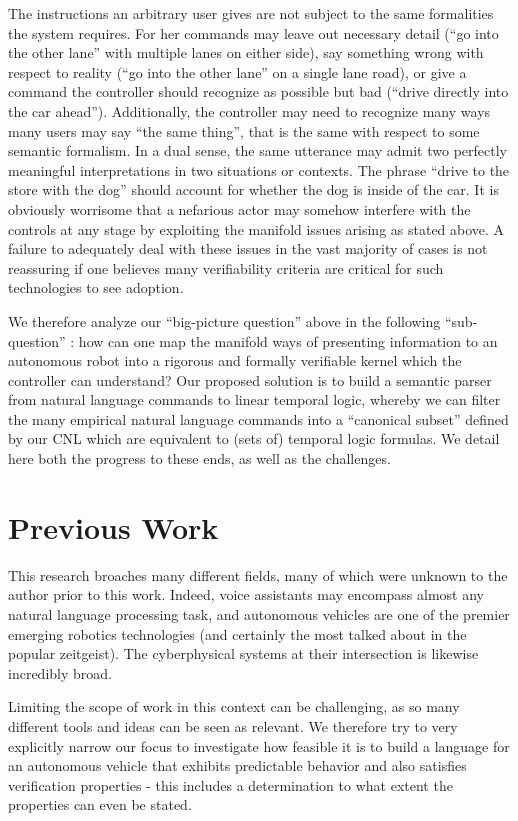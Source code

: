 \documentclass[a4paper, 11pt]{article}
\begin{document}
The instructions an arbitrary user gives are not subject to the same formalities
the system requires. For her commands may leave out necessary detail (``go into
the other lane'' with multiple lanes on either side), say something wrong with
respect to reality (``go into the other lane'' on a single lane road), or give a
command the controller should recognize as possible but bad (``drive directly
into the car ahead''). Additionally, the controller may need to recognize many
ways many users may say ``the same thing'', that is the same with respect to
some semantic formalism. In a dual sense, the same utterance may admit two
perfectly meaningful interpretations in two situations or contexts. The phrase
``drive to the store with the dog'' should account for whether the dog is inside
of the car. It is obviously worrisome that a nefarious actor may somehow
interfere with the controls at any stage by exploiting the manifold issues
arising as stated above. A failure to adequately deal with these issues in the
vast majority of cases is not reassuring if one believes many verifiability
criteria are critical for such technologies to see adoption.

We therefore analyze our ``big-picture question'' above in the following
``sub-question'' : how can one map the manifold ways of presenting information
to an autonomous robot into a rigorous and formally verifiable kernel which the
controller can understand? Our proposed solution is to build a semantic parser
from natural language commands to linear temporal logic, whereby we can filter
the many empirical natural language commands into a ``canonical subset'' defined
by our CNL which are equivalent to (sets of) temporal logic formulas. We detail
here both the progress to these ends, as well as the challenges.

\section{Previous Work} 

This research broaches many different fields, many of which were
unknown to the author prior to this work. Indeed, voice assistants may
encompass almost any natural language processing task, and autonomous vehicles are
one of the premier emerging robotics technologies (and certainly the most talked
about in the popular zeitgeist). The cyberphysical systems at their intersection is
likewise incredibly broad.

Limiting the scope of work in this context can be challenging, as so many
different tools and ideas can be seen as relevant. We therefore try to very
explicitly narrow our focus to investigate how feasible it is to build a
language for an autonomous vehicle that exhibits predictable behavior and also
satisfies verification properties - this includes a determination to what extent
the properties can even be stated.
\end{document}
